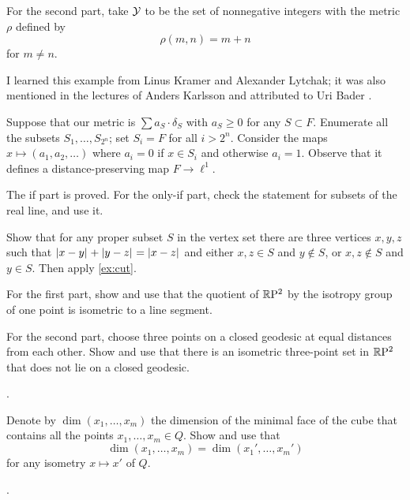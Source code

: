 For the second part, take $\mathcal{Y}$ to be the set of nonnegative integers with the metric $\rho$ defined by
\[\rho(m,n)=m+n\] 
for $m\ne n$.

\medskip

I learned this example from Linus Kramer and Alexander Lytchak;
it was also mentioned in the lectures of Anders Karlsson
and attributed to Uri Bader \cite[2.3]{karlsson}.

Suppose that our metric is $\sum a_S\cdot\delta_S$ with $a_S\ge 0$ for any $S\subset F$.
Enumerate all the subsets $S_1,\dots,S_{2^n}$;
set $S_i=F$ for all $i>2^n$. 
Consider the maps $x\mapsto (a_1,a_2,\dots)$ where $a_i=0$ if $x\in S_i$ and otherwise $a_i=1$.
Observe that it defines a distance-preserving map $F\to \ell^1$. 

The if part is proved.
For the only-if part, check the statement for subsets of the real line, and use it.

Show that for any proper subset $S$ in the vertex set there are three vertices $x,y,z$ such that $\dist{x}{y}{} +\dist{y}{z}{}=\dist{x}{z}{}$ and either 
$x,z\in S$ and $y\notin S$, or $x,z\notin S$ and $y\in S$.
Then apply \ref{ex:cut}.

For the first part, show and use that the quotient of $\mathbb{R}\mathrm{P}^2$ by the isotropy group of one point is isometric to a line segment.

For the second part, choose three points on a closed geodesic at equal distances from each other.
Show and use that there is an isometric three-point set in $\mathbb{R}\mathrm{P}^2$ that does not lie on a closed geodesic.

 \cite[V \S 2]{busemann-1942}.

Denote by $\dim(x_1,\dots,x_m)$ the dimension of the minimal face of the cube that contains all the points $x_1,\dots,x_m\in Q$.
Show and use that 
\[\dim(x_1,\dots,x_m)=\dim(x_1',\dots,x_m')\]
for any isometry $x\mapsto x'$ of $Q$.

 \cite[prop. 6 and 7]{berestovskii-nikonorov}.
